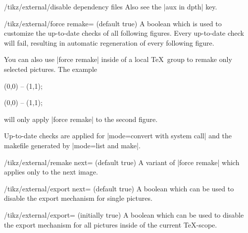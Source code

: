 {\begin{key}{/tikz/external/disable dependency files}
	Also see the |aux in dpth| key.
\end{key}

\begin{key}{/tikz/external/force remake= (default true)}
	A boolean which is used to customize the up-to-date checks of all following figures. Every up-to-date check will fail, resulting in automatic regeneration of every following figure.

\begin{codeexample}
\tikzset{external/force remake}
\end{codeexample}
	You can also use |force remake| inside of a local \TeX\ group to remake only selected pictures. The example
\begin{codeexample}
\tikz \draw (0,0) -- (1,1);

{
\tikzset{external/force remake}
}

\tikz \draw (0,0) -- (1,1);
\end{codeexample}
	will only apply |force remake| to the second figure.

	Up-to-date checks are applied for |mode=convert with system call| and the makefile generated by |mode=list and make|.
\end{key}

\begin{key}{/tikz/external/remake next= (default true)}
	A variant of |force remake| which applies only to the next image.
\end{key}

\begin{key}{/tikz/external/export next= (default true)}
	A boolean which can be used to disable the export mechanism for single pictures.
\end{key}

\begin{key}{/tikz/external/export= (initially true)}
	A boolean which can be used to disable the export mechanism for all pictures inside of the current \TeX-scope.

\begin{codeexample}



\end{codeexample}
\end{key}}
